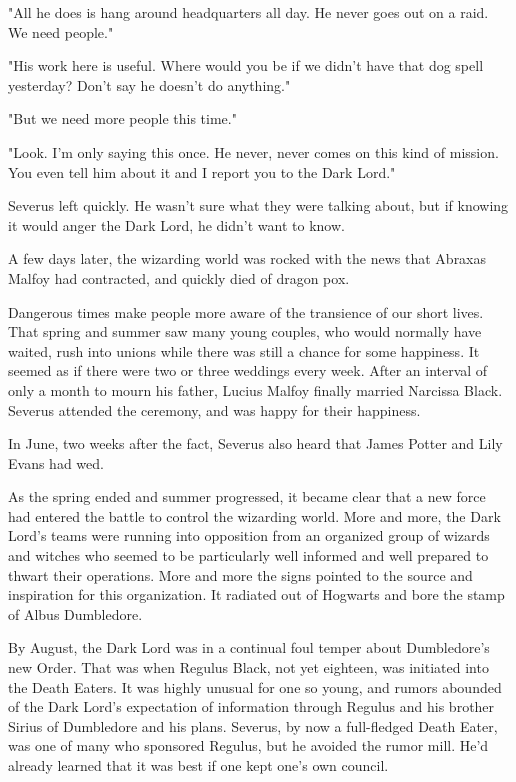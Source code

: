 "All he does is hang around headquarters all day. He never goes out on a raid. We need people."

"His work here is useful. Where would you be if we didn't have that dog spell yesterday? Don't say he doesn't do anything."

"But we need more people this time."

"Look. I'm only saying this once. He never, never comes on this kind of mission. You even tell him about it and I report you to the Dark Lord."

Severus left quickly. He wasn't sure what they were talking about, but if knowing it would anger the Dark Lord, he didn't want to know.

A few days later, the wizarding world was rocked with the news that Abraxas Malfoy had contracted, and quickly died of dragon pox.

Dangerous times make people more aware of the transience of our short lives. That spring and summer saw many young couples, who would normally have waited, rush into unions while there was still a chance for some happiness. It seemed as if there were two or three weddings every week. After an interval of only a month to mourn his father, Lucius Malfoy finally married Narcissa Black. Severus attended the ceremony, and was happy for their happiness.

In June, two weeks after the fact, Severus also heard that James Potter and Lily Evans had wed.

As the spring ended and summer progressed, it became clear that a new force had entered the battle to control the wizarding world. More and more, the Dark Lord's teams were running into opposition from an organized group of wizards and witches who seemed to be particularly well informed and well prepared to thwart their operations. More and more the signs pointed to the source and inspiration for this organization. It radiated out of Hogwarts and bore the stamp of Albus Dumbledore.

By August, the Dark Lord was in a continual foul temper about Dumbledore's new Order. That was when Regulus Black, not yet eighteen, was initiated into the Death Eaters. It was highly unusual for one so young, and rumors abounded of the Dark Lord's expectation of information through Regulus and his brother Sirius of Dumbledore and his plans. Severus, by now a full-fledged Death Eater, was one of many who sponsored Regulus, but he avoided the rumor mill. He'd already learned that it was best if one kept one's own council.

